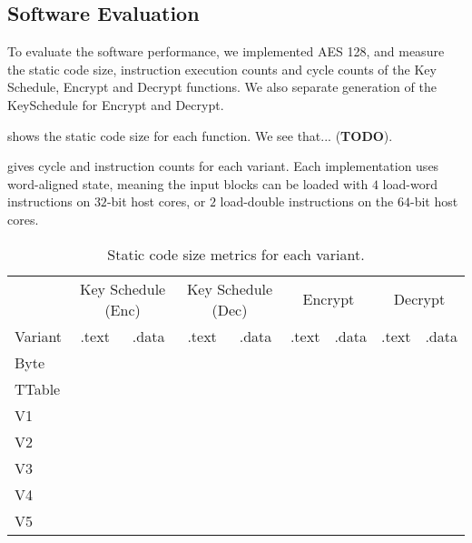 
\subsection{Software Evaluation}
\label{sec:eval:sw}

To evaluate the software performance, we implemented AES 128, and
measure the static code size, instruction execution counts and cycle
counts of the Key Schedule, Encrypt and Decrypt functions.
We also separate generation of the KeySchedule for Encrypt and Decrypt.

 shows the static code size for each
function.
We see that... ({\bf TODO}).

 gives cycle and instruction counts for each
variant.
Each implementation uses word-aligned state, meaning the input blocks
can be loaded with $4$ load-word instructions on $32$-bit host cores,
or $2$ load-double instructions on the $64$-bit host cores.

\begin{table}
\centering
\begin{tabular}{l|cc|cc|cc|cc}
 &
\multicolumn{2}{c}{Key Schedule (Enc)} &
\multicolumn{2}{c}{Key Schedule (Dec)} &
\multicolumn{2}{c}{Encrypt} &
\multicolumn{2}{c}{Decrypt}  \\
Variant & .text & .data & .text & .data & .text & .data & .text & .data  \\ \hline
Byte    &       &       &       &       &       &       &       &        \\
TTable  &       &       &       &       &       &       &       &        \\
V1      &       &       &       &       &       &       &       &        \\
V2      &       &       &       &       &       &       &       &        \\
V3      &       &       &       &       &       &       &       &        \\
V4      &       &       &       &       &       &       &       &        \\
V5      &       &       &       &       &       &       &       &        \\
\end{tabular}
\caption{
Static code size metrics for each variant.
}
\label{tab:eval:sw:size}
\end{table}


